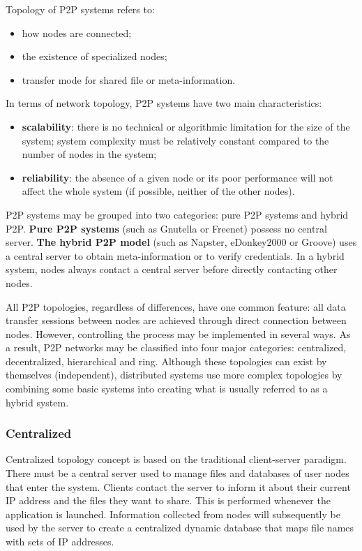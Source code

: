 Topology of P2P systems refers to:
\begin{itemize}
  \item how nodes are connected;
  \item the existence of specialized nodes;
  \item transfer mode for shared file or meta-information.
\end{itemize}

In terms of network topology, P2P systems have two main characteristics:

\begin{itemize}
  \item \textbf{scalability}: there is no technical or algorithmic limitation
  for the size of the system; system complexity must be relatively constant
  compared to the number of nodes in the system;
  \item \textbf{reliability}: the absence of a given node or its poor
  performance will not affect the whole system (if possible, neither of the
  other nodes).
\end{itemize}

P2P systems may be grouped into two categories: pure P2P systems and hybrid
P2P. \textbf{Pure P2P systems} (such as Gnutella or Freenet) possess no
central server. \textbf{The hybrid P2P model} (such as Napster, eDonkey2000 or
Groove) uses a central server to obtain meta-information or to verify
credentials. In a hybrid system, nodes always contact a central server before
directly contacting other nodes.

All P2P topologies, regardless of differences, have one common feature: all
data transfer sessions between nodes are achieved through direct connection
between nodes. However, controlling the process may be implemented in several
ways. As a result, P2P networks may be classified into four major categories:
centralized, decentralized, hierarchical and ring. Although these topologies
can exist by themselves (independent), distributed systems use more complex
topologies by combining some basic systems into creating what is usually
referred to as a hybrid system.

\subsubsection{Centralized}

Centralized topology concept is based on the traditional client-server
paradigm. There must be a central server used to manage files and databases
of user nodes that enter the system. Clients contact the server to
inform it about their current IP address and the files they want to share.
This is performed whenever the application is launched. Information collected
from nodes will subsequently be used by the server to create a centralized
dynamic database that maps file names with sets of IP addresses.

